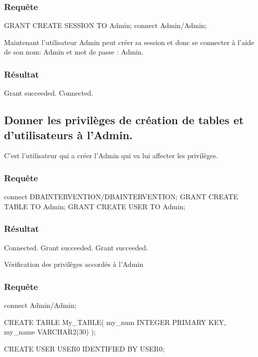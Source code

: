 \documentclass[•]{article}
\begin{document}
\subsubsection{Requête}
\begin{sql}
GRANT CREATE SESSION TO Admin;
connect Admin/Admin;
\end{sql}

\textrm{Maintenant l'utilisateur Admin peut créer sa session et donc se connecter à l'aide de son nom: Admin et mot de passe : Admin.}

\subsubsection{Résultat}
\begin{sql}
Grant succeeded.
Connected.
\end{sql}

\subsection{Donner les privilèges de création de tables et d'utilisateurs à l'Admin.}
\textrm{C'est l'utilisateur qui a créer l'Admin qui va lui affecter les privilèges.}

\subsubsection{Requête}
\begin{sql}
connect DBAINTERVENTION/DBAINTERVENTION;
GRANT CREATE TABLE TO Admin;
GRANT CREATE USER TO Admin;
\end{sql}
\subsubsection{Résultat}
\begin{sql}
Connected.
Grant succeeded.
Grant succeeded.
\end{sql}

\textrm{Vérification des privilèges accordés à l'Admin}
\subsubsection{Requête}
\begin{sql}
connect Admin/Admin;
	
CREATE TABLE My_TABLE(
my_num INTEGER PRIMARY KEY,
my_name VARCHAR2(30)
);
	
CREATE USER USER0 IDENTIFIED BY USER0;
\end{sql}
\end{document}
